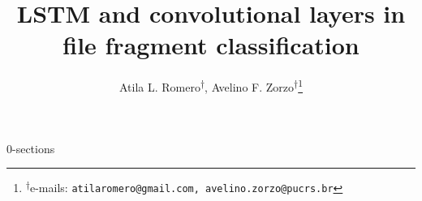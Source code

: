 \documentclass[english,oneside]{article}
\author{Atila L. Romero\textsuperscript{$\dagger$}, Avelino F. Zorzo\textsuperscript{$\dagger$}{\let\thefootnote\relax\footnote{{\textsuperscript{$\dagger$}e-mails: \texttt{atilaromero@gmail.com, avelino.zorzo@pucrs.br}}}}}
\title{LSTM and convolutional layers in file fragment classification}
\date{}
\begin{document}
\maketitle




{0-sections}

% 
%


\end{document}
